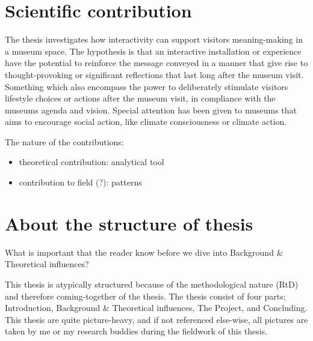 \section{Scientific contribution}
The thesis investigates how interactivity can support visitors meaning-making in a museum space. The hypothesis is that an interactive installation or experience have the potential to reinforce the message conveyed in a manner that give rise to thought-provoking or significant reflections that last long after the museum visit. Something which also encompass the power to deliberately stimulate visitors lifestyle choices or actions after the museum visit, in compliance with the museums agenda and vision. Special attention has been given to museums that aims to encourage social action, like climate consciousness or climate action.

The nature of the contributions:
\begin{itemize}
    \item theoretical contribution: analytical tool
    \item contribution to field (?): patterns
\end{itemize}

\section{About the structure of thesis}
What is important that the reader know before we dive into Background \& Theoretical influences?

This thesis is atypically structured because of the methodological nature (RtD) and therefore coming-together of the thesis. The thesis consist of four parts; Introduction, Background \& Theoretical influences, The Project, and Concluding. This thesis are quite picture-heavy, and if not referenced else-wise, all pictures are taken by me or my research buddies during the fieldwork of this thesis.